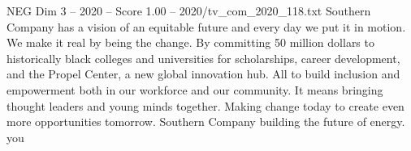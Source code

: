 \begin{textsample}{NEG Dim 3 – 2020 – Score 1.00 – 2020/tv\_com\_2020\_118.txt}  \label{ex:f3_neg_038}
Southern Company has a vision of an equitable future and every day we put it in motion.
We make it real by being the change.
By committing 50 million dollars to historically black colleges and universities for scholarships, career development, and the Propel Center, a new global innovation hub.
All to build inclusion and empowerment both in our workforce and our community.
It means bringing thought leaders and young minds together.
Making change today to create even more opportunities tomorrow.
Southern Company building the future of energy. you

\end{textsample}
